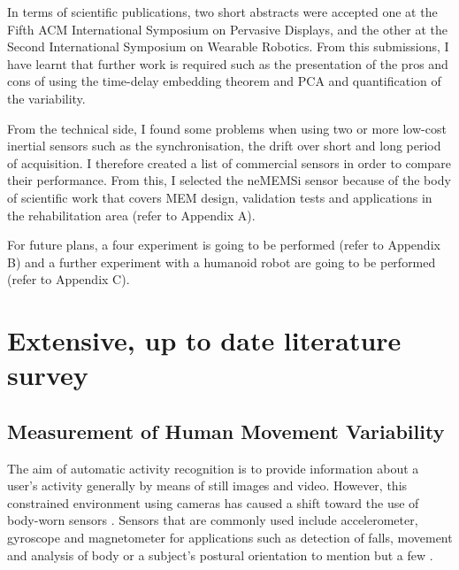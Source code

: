 \documentclass[9pt,journal,onecolumn,compsoc]{IEEEtran}
\begin{document}
In terms of scientific publications, two short abstracts were accepted one at
the Fifth ACM International Symposium on Pervasive Displays, and 
the other at the Second International Symposium on Wearable Robotics.
From this submissions, I have learnt that further work is 
required such as the presentation of the pros and cons of using the time-delay embedding theorem and PCA
and quantification of the variability.

From the technical side, I found some problems when using two or more 
low-cost inertial sensors such as the synchronisation, the drift over short and long period of acquisition.
I therefore created a list of commercial sensors in order to compare their performance.
From this, I selected the neMEMSi sensor because of the body of scientific work that covers
MEM design, validation tests and applications in the rehabilitation area (refer to Appendix A).


For future plans, a four experiment is going to be performed (refer to Appendix B)
and a further experiment with a humanoid robot are going to be performed (refer to Appendix C).


\appendices

\section{Extensive, up to date literature survey}

\subsection{Measurement of Human Movement Variability}

The aim of automatic activity recognition is to provide information about a user's activity
generally by means of still images and video. 
However, this constrained environment using cameras has caused a shift toward 
the use of body-worn sensors \cite{bulling2014}. Sensors that are commonly used 
include accelerometer, gyroscope and magnetometer for applications such as detection of falls, 
movement and analysis of body or a subject's postural orientation to mention but a few \cite{Mukhopadhyay2014}.
\end{document}
